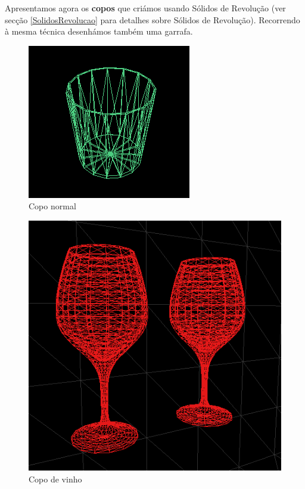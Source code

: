 \documentclass[a5paper,onecolumn, 11pt]{article}
\begin{document}
\begin{description}
Apresentamos agora os \textbf{copos} que criámos usando Sólidos de Revolução (ver secção \ref{SolidosRevolucao} para detalhes sobre Sólidos de Revolução). Recorrendo à mesma técnica desenhámos também uma garrafa.
\begin{figure}[!htb]
    \centering
    \includegraphics[scale=1]{copo.png}
    \caption{Copo normal}
\end{figure}
\begin{figure}[!htb]
    \centering
    \includegraphics[scale=0.8]{vinho.png}
    \caption{Copo de vinho}
\end{figure}
\begin{figure}[!htb]
    \centering

\end{figure}
\end{description}
\end{document}
